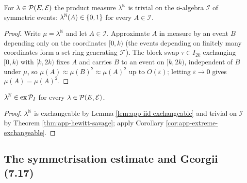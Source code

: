 \begin{theorem}
    \label{thm:app-hewitt-savage}
    \leanok

    For $\lambda \in \mathcal{P}(E, \mathcal{E})$ the product measure $\lambda^{\mathbb{N}}$ is
    trivial on the σ-algebra $\mathcal{I}$ of symmetric events:
    $\lambda^{\mathbb{N}}(A) \in \left\{ 0,1 \right\}$ for every $A \in \mathcal{I}$.
\end{theorem}
\begin{proof}
    \leanok

    Write $\mu = \lambda^{\mathbb{N}}$ and let $A \in \mathcal{I}$.  Approximate $A$ in measure
    by an event $B$ depending only on the coordinates $[0,k)$ (the events depending on finitely
    many coordinates form a set ring generating $\mathcal{F}$).  The block swap
    $\tau \in I_{2k}$ exchanging $[0,k)$ with $[k,2k)$ fixes $A$ and carries $B$ to an event on
    $[k,2k)$, independent of $B$ under $\mu$, so
    $\mu(A) \approx \mu(B)^2 \approx \mu(A)^2$ up to $O(\varepsilon)$; letting
    $\varepsilon \to 0$ gives $\mu(A) = \mu(A)^2$.
\end{proof}

\begin{corollary}
    \label{cor:app-iid-extreme}
    \leanok

    $\lambda^{\mathbb{N}} \in \mathrm{ex}\,\mathcal{P}_I$ for every
    $\lambda \in \mathcal{P}(E, \mathcal{E})$.
\end{corollary}
\begin{proof}
    \leanok

    $\lambda^{\mathbb{N}}$ is exchangeable by Lemma \ref{lem:app-iid-exchangeable} and trivial
    on $\mathcal{I}$ by Theorem \ref{thm:app-hewitt-savage}; apply Corollary
    \ref{cor:app-extreme-exchangeable}.
\end{proof}

\subsection*{The symmetrisation estimate and Georgii (7.17)}


